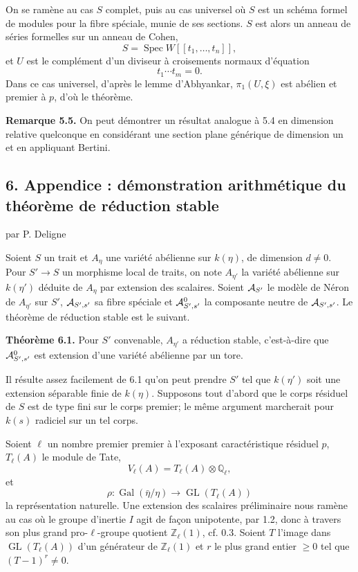 \documentclass[11pt]{article}
\providecommand{\Spec}{\operatorname{Spec}}
\providecommand{\Gal}{\operatorname{Gal}}
\providecommand{\GL}{\operatorname{GL}}
\providecommand{\Ql}{\mathbb Q_\ell}
\providecommand{\Zl}{\mathbb Z_\ell}
\begin{document}
On se ramène au cas $S$ complet, puis au cas universel où $S$ est un schéma formel de modules pour la fibre spéciale, munie de ses sections. $S$ est alors un anneau de séries formelles sur un anneau de Cohen,
\[
 S=\Spec W[[t_1,\ldots,t_n]],
\]
et $U$ est le complément d'un diviseur à croisements normaux d'équation
\[
 t_1\cdots t_m=0.
\]
Dans ce cas universel, d'après le lemme d'Abhyankar, $\pi_1(U,\xi)$ est abélien et premier à $p$, d'où le théorème.

\textbf{Remarque 5.5.} On peut démontrer un résultat analogue à 5.4 en dimension relative quelconque en considérant une section plane générique de dimension un et en appliquant Bertini.

\subsection*{6. Appendice : démonstration arithmétique du théorème de réduction stable}
\begin{center}
par P. Deligne
\end{center}
Soient $S$ un trait et $A_\eta$ une variété abélienne sur $k(\eta)$, de dimension $d\ne0$. Pour $S'\to S$ un morphisme local de traits, on note $A_{\eta'}$ la variété abélienne sur $k(\eta')$ déduite de $A_\eta$ par extension des scalaires. Soient $\mathcal A_{S'}$ le modèle de Néron de $A_{\eta'}$ sur $S'$, $\mathcal A_{S',s'}$ sa fibre spéciale et $\mathcal A^0_{S',s'}$ la composante neutre de $\mathcal A_{S',s'}$. Le théorème de réduction stable est le suivant.

\textbf{Théorème 6.1.} Pour $S'$ convenable, $A_{\eta'}$ a réduction stable, c'est-à-dire que $\mathcal A^0_{S',s'}$ est extension d'une variété abélienne par un tore.

Il résulte assez facilement de 6.1 qu'on peut prendre $S'$ tel que $k(\eta')$ soit une extension séparable finie de $k(\eta)$. Supposons tout d'abord que le corps résiduel de $S$ est de type fini sur le corps premier; le même argument marcherait pour $k(s)$ radiciel sur un tel corps.

Soient $\ell$ un nombre premier premier à l'exposant caractéristique résiduel $p$, $T_\ell(A)$ le module de Tate,
\[
 V_\ell(A)=T_\ell(A)\otimes\Ql,
\]
et
\[
 \rho:\Gal(\bar\eta/\eta)\longrightarrow \GL(T_\ell(A))
\]
la représentation naturelle. Une extension des scalaires préliminaire nous ramène au cas où le groupe d'inertie $I$ agit de façon unipotente, par 1.2, donc à travers son plus grand pro-$\ell$-groupe quotient $\Zl(1)$, cf. 0.3. Soient $T$ l'image dans $\GL(T_\ell(A))$ d'un générateur de $\Zl(1)$ et $r$ le plus grand entier $\ge0$ tel que $(T-1)^r\ne0$.
\end{document}
